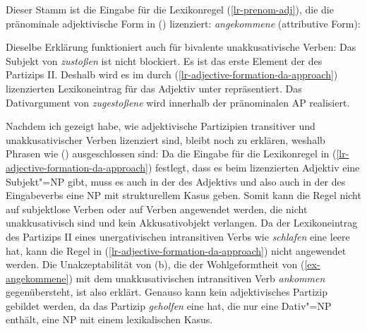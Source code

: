 {\noindent
Dieser Stamm ist die Eingabe für die Lexikonregel (\ref{lr-prenom-adj}),
die die pränominale adjektivische Form in () lizenziert:
\eas
\emph{angekommene} (attributive Form):\\
\zs

\noindent
Dieselbe Erklärung funktioniert auch für bivalente unakkusativische Verben:
\z
Das Subjekt von \emph{zustoßen} ist nicht blockiert.
Es ist das erste Element der \argstl des Partizips II.
Deshalb wird es im durch (\ref{lr-adjective-formation-da-approach}) lizenzierten
Lexikoneintrag für das Adjektiv unter \subj repräsentiert.
Das Dativargument von \emph{zugestoßene} wird innerhalb der pränominalen AP realisiert.

Nachdem ich gezeigt habe, wie adjektivische Partizipien transitiver
und unakkusativischer Verben lizenziert sind, bleibt noch zu erklären,
weshalb Phrasen wie () ausgeschlossen sind:
Da die Eingabe für die Lexikonregel in (\ref{lr-adjective-formation-da-approach})
festlegt, dass es beim lizenzierten Adjektiv eine Subjekt"=NP gibt, muss es auch in der \argstl des
Adjektivs und also auch in der \argstl des Eingabeverbs eine NP mit strukturellem Kasus
geben. Somit kann die Regel nicht auf subjektlose Verben oder auf Verben angewendet
werden, die nicht unakkusativisch sind und kein Akkusativobjekt verlangen.
\eal
{}
\zl
Da der Lexikoneintrag des Partizips II eines unergativischen intransitiven Verbs
wie \emph{schlafen} eine leere \argstl hat, kann die Regel in (\ref{lr-adjective-formation-da-approach}) nicht angewendet
werden. Die Unakzeptabilität von (b), die der Wohlgeformtheit von (\ref{ex-angekommene}) mit dem unakkusativischen
intransitiven Verb \emph{ankommen} gegenübersteht, ist also erklärt.
Genauso kann kein adjektivisches Partizip  gebildet werden, da das Partizip \emph{geholfen}
eine \argstl hat, die nur eine Dativ"=NP enthält, \dash eine NP mit einem lexikalischen Kasus.


}
